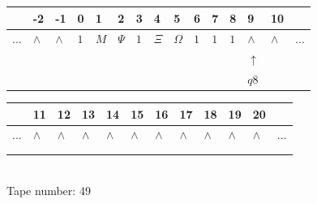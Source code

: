 \documentclass[11pt]{article}
\begin{document}
\begin{table}[H]
\centering
\begin{tabular}{lllllllllllllll}
 & -2 & -1 & 0 & 1 & 2 & 3 & 4 & 5 & 6 & 7 & 8 & 9 & 10 & \\
\hline
$...$ & \multicolumn{1}{|l|}{$\wedge$} & \multicolumn{1}{|l|}{$\wedge$} & \multicolumn{1}{|l|}{$1$} & \multicolumn{1}{|l|}{$M$} & \multicolumn{1}{|l|}{$\Psi$} & \multicolumn{1}{|l|}{$1$} & \multicolumn{1}{|l|}{$\Xi$} & \multicolumn{1}{|l|}{$\Omega$} & \multicolumn{1}{|l|}{$1$} & \multicolumn{1}{|l|}{$1$} & \multicolumn{1}{|l|}{$1$} & \multicolumn{1}{|l|}{$\wedge$} & \multicolumn{1}{|l|}{$\wedge$} & $...$\\
\hline
&  &  &  &  &  &  &  &  &  &  &  & $\uparrow$ &  &  \\
&  &  &  &  &  &  &  &  &  &  &  & $ q8 $ &  &  \\
\end{tabular}
\begin{tabular}{llllllllllll}
 & 11 & 12 & 13 & 14 & 15 & 16 & 17 & 18 & 19 & 20 & \\
\hline
$...$ & \multicolumn{1}{|l|}{$\wedge$} & \multicolumn{1}{|l|}{$\wedge$} & \multicolumn{1}{|l|}{$\wedge$} & \multicolumn{1}{|l|}{$\wedge$} & \multicolumn{1}{|l|}{$\wedge$} & \multicolumn{1}{|l|}{$\wedge$} & \multicolumn{1}{|l|}{$\wedge$} & \multicolumn{1}{|l|}{$\wedge$} & \multicolumn{1}{|l|}{$\wedge$} & \multicolumn{1}{|l|}{$\wedge$} & $...$\\
\hline
&  &  &  &  &  &  &  &  &  &  &  \\
&  &  &  &  &  &  &  &  &  &  &  \\
\end{tabular}
\\
Tape number: 49
\noindent\makebox[\linewidth]{\hdashrule{\textwidth}{1pt}{1pt}}\end{table}
\end{document}
